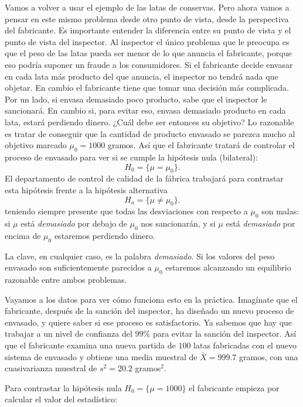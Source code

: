 \documentclass[10pt,a4paper]{article}\usepackage[]{graphicx}\usepackage[]{color}
\newcounter {cont01}
\begin{document}
Vamos a volver a usar el ejemplo de las latas de conservas. Pero ahora vamos a pensar en este mismo problema desde otro punto de vista, desde la perspectiva del fabricante. Es importante entender la diferencia entre su punto de vista y el punto de vista del inspector. Al inspector el único problema que le preocupa es que el peso de las latas pueda ser menor de lo que anuncia el fabricante, porque eso podría suponer un fraude a los consumidores. Si el fabricante decide envasar en cada lata más producto del que anuncia, el inspector no tendrá nada que objetar. En cambio el fabricante tiene que tomar una decisión más complicada. Por un lado, si envasa demasiado poco producto, sabe que el inspector le sancionará. En cambio si, para evitar eso, envasa demasiado producto en cada lata, estará perdiendo dinero. ¿Cuál debe ser entonces su objetivo? Lo razonable es tratar de conseguir que la cantidad de producto envasado se parezca mucho al objetivo marcado $\mu_0=1000$ gramos. Así que el fabricante tratará de controlar el proceso de envasado para ver si se cumple la hipótesis nula (bilateral):
\[ H_0=\{\mu = \mu_0\}.\]
El departamento de control de calidad de la fábrica trabajará para contrastar esta hipótesis frente a la hipótesis alternativa
\[ H_a=\{\mu\neq \mu_0\}.\]
teniendo siempre presente que todas las desviaciones con respecto a $\mu_0$ son malas: si $\mu$  está {\em demasiado} por debajo de $\mu_0$ nos sancionarán, y si $\mu$ está {\em demasiado} por encima de $\mu_0$ estaremos perdiendo dinero.

La clave, en cualquier caso, es la palabra {\em demasiado}. Si los valores del peso envasado son suficientemente parecidos a $\mu_0$ estaremos alcanzando un equilibrio razonable entre ambos problemas.

Vayamos a los datos para ver cómo funciona esto en la práctica. Imagínate que el fabricante, después de la sanción del inspector, ha diseñado un nuevo proceso de envasado, y quiere saber si ese proceso es satisfactorio. Ya sabemos que hay que trabajar a un nivel de confianza del $99\%$ para evitar la sanción del inspector. Así que el fabricante examina una nueva partida de $100$ latas fabricadas con el nuevo sistema de envasado y obtiene una media muestral de $\bar X = 999.7$ gramos, con una cuasivarianza muestral de $s^2 = 20.2$ gramos$^2$.

Para contrastar la hipótesis nula $H_0=\{\mu = 1000\}$ el fabricante empieza por calcular el valor del estadístico:
\end{document}
